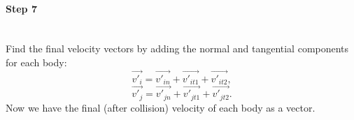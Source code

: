 \paragraph{Step 7}
~\\
Find the final velocity vectors by adding the normal and tangential components for each body:
\begin{equation*}
	\vec{v'_i} = \vec{v'_{in}} + \vec{v'_{it1}} + \vec{v'_{it2}},
\end{equation*}
\begin{equation*}
	\vec{v'_j} = \vec{v'_{jn}} + \vec{v'_{jt1}} + \vec{v'_{jt2}}.
\end{equation*}
Now we have the final (after collision) velocity of each body as a vector.